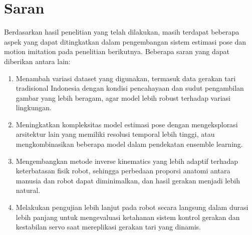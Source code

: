 \section{Saran}

Berdasarkan hasil penelitian yang telah dilakukan, masih terdapat beberapa aspek yang dapat ditingkatkan dalam pengembangan sistem estimasi pose dan motion imitation pada penelitian berikutnya. Beberapa saran yang dapat diberikan antara lain:

\begin{enumerate}
    \item Menambah variasi dataset yang digunakan, termasuk data gerakan tari tradisional Indonesia dengan kondisi pencahayaan dan sudut pengambilan gambar yang lebih beragam, agar model lebih robust terhadap variasi lingkungan.
    
    \item Meningkatkan kompleksitas model estimasi pose dengan mengeksplorasi arsitektur lain yang memiliki resolusi temporal lebih tinggi, atau mengkombinasikan beberapa model dalam pendekatan ensemble learning.
    
    \item Mengembangkan metode inverse kinematics yang lebih adaptif terhadap keterbatasan fisik robot, sehingga perbedaan proporsi anatomi antara manusia dan robot dapat diminimalkan, dan hasil gerakan menjadi lebih natural.
    
    \item Melakukan pengujian lebih lanjut pada robot secara langsung dalam durasi lebih panjang untuk mengevaluasi ketahanan sistem kontrol gerakan dan kestabilan servo saat mereplikasi gerakan tari yang dinamis.
\end{enumerate}

